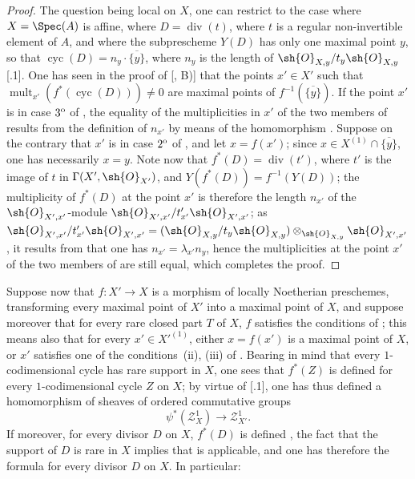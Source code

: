 \begin{proof}
The question being local on $X$, one can restrict to the case where $X=\Spec(A)$ is affine, where $D=\operatorname{div}(t)$, where $t$ is a regular non-invertible element of $A$, and where the subprescheme $Y(D)$  has only one maximal point $y$, so that $\operatorname{cyc}(D)=n_y\cdot\overline{\{y\}}$, where $n_y$ is the length of $\sh{O}_{X,y}/t_y\sh{O}_{X,y}$ [.1].
One has seen in the proof of [, B)] that the points $x'\in X'$ such that $\operatorname{mult}_{x'}(f^*(\operatorname{cyc}(D)))\neq 0$ are maximal points of $f^{-1}(\overline{\{y\}})$.
If the point $x'$ is in case $3\textsuperscript{o}$ of , the equality of the multiplicities in $x'$ of the two members of  results from the definition of $n_{x'}$ by means of the homomorphism .
Suppose on the contrary that $x'$ is in case $2\textsuperscript{o}$ of , and let $x=f(x')$;
since $x\in X^{(1)}\cap\overline{\{y\}}$, one has necessarily $x=y$.
Note now that $f^*(D)=\operatorname{div}(t')$, where $t'$ is the image of $t$ in $\Gamma(X',\sh{O}_{X'})$, and $Y(f^*(D))=f^{-1}(Y(D))$;
the multiplicity of $f^*(D)$ at the point $x'$ is therefore the length $n_{x'}$ of the $\sh{O}_{X',x'}$-module $\sh{O}_{X',x'}/t'_{x'}\sh{O}_{X',x'}$;
as $\sh{O}_{X',x'}/t'_{x'}\sh{O}_{X',x'}=(\sh{O}_{X,y}/t_y\sh{O}_{X,y})\otimes_{\sh{O}_{X,y}}\sh{O}_{X',x'}$, it results from  that one has $n_{x'}=\lambda_{x'}n_y$, hence the multiplicities at the point $x'$ of the two members of  are still equal, which completes the proof.
\end{proof}

\begin{env}[21.10.5]
\label{IV.21.10.5}
Suppose now that $f:X'\to X$ is a morphism of locally Noetherian preschemes, transforming every maximal point of $X'$ into a maximal point of $X$, and suppose moreover that for every rare closed part $T$ of $X$, $f$ satisfies the conditions of ;
this means also that for every $x'\in X'^{(1)}$, either $x=f(x')$ is a maximal point of $X$, or $x'$ satisfies one of the conditions~(ii), (iii) of .
Bearing in mind that every $1$-codimensional cycle has rare support in $X$, one sees that $f^*(Z)$ is defined for every $1$-codimensional cycle $Z$ on $X$;
by virtue of [.1], one has thus defined a homomorphism of sheaves of ordered commutative groups
\[
  \psi^*(\mathscr{Z}_X^1)\to\mathscr{Z}_{X'}^1.
\]
If moreover, for every divisor $D$ on $X$, $f^*(D)$ is defined , the fact that the support of $D$ is rare in $X$  implies that  is applicable, and one has therefore the formula  for every divisor $D$ on $X$.
In particular:
\end{env}

